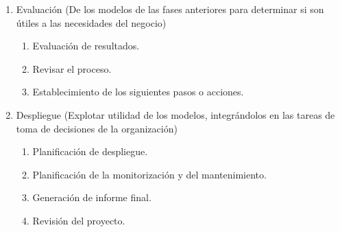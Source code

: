 \begin{enumerate}
 \item Evaluación (De los modelos de las fases anteriores para determinar si son útiles a las
necesidades del negocio)
    \begin{enumerate}
        \item Evaluación de resultados.
        \item Revisar el proceso.
        \item Establecimiento de los siguientes pasos o acciones.
    \end{enumerate}

 \item  Despliegue (Explotar utilidad de los modelos, integrándolos en las tareas de toma de
decisiones de la organización)
    \begin{enumerate}
       \item Planificación de despliegue.
    \item Planificación de la monitorización y del mantenimiento.
    \item Generación de informe final.
    \item Revisión del proyecto.
    \end{enumerate}


\end{enumerate}
